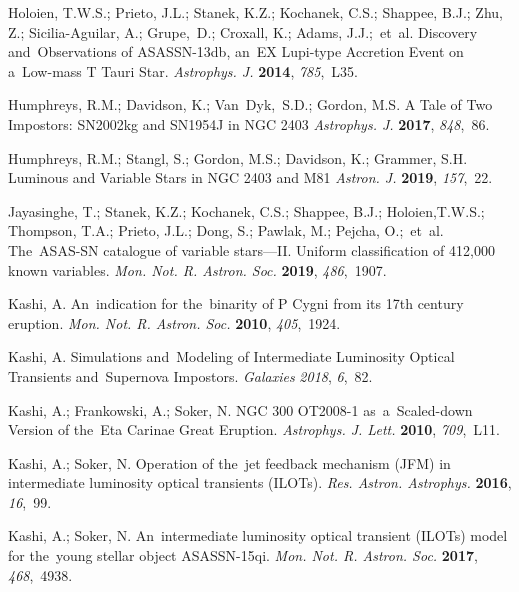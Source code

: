 \documentclass[galaxies,article,accept,moreauthors,pdftex]{mdpi}
\makeatletter
\let\jnl@style=\rmfamily
\def\ref@jnl#1{{\jnl@style#1}}%
\newcommand\aj{\ref@jnl{Astron. J.}}%
\newcommand\apj{\ref@jnl{Astrophys. J.}}%
\newcommand\apjl{\ref@jnl{Astrophys. J. Lett.}}     %
\newcommand\mnras{\ref@jnl{Mon. Not. R. Astron. Soc.}}%
\makeatother
\begin{document}
\begin{thebibliography}{999}
 Holoien, T.W.S.; Prieto, J.L.; Stanek, K.Z.; Kochanek, C.S.; Shappee, B.J.; Zhu, Z.; Sicilia-Aguilar, A.; Grupe,~D.; Croxall, K.; Adams, J.J.;~et~al. Discovery and~Observations of ASASSN-13db, an~EX Lupi-type Accretion Event on a~Low-mass T Tauri Star. {\em \apj} \textbf{2014}, \emph{785},~L35.



 Humphreys, R.M.; Davidson, K.; Van~Dyk,~S.D.; Gordon, M.S. A Tale of Two Impostors: SN2002kg and SN1954J in NGC 2403 {\em \apj} \textbf{2017}, \emph{848},~86.


 Humphreys, R.M.; Stangl, S.; Gordon, M.S.; Davidson, K.; Grammer, S.H. Luminous and Variable Stars in NGC 2403 and M81 {\em \aj} \textbf{2019}, \emph{157},~22.



 Jayasinghe, T.; Stanek, K.Z.; Kochanek, C.S.; Shappee, B.J.; Holoien,T.W.S.; Thompson, T.A.; Prieto, J.L.; Dong, S.; Pawlak, M.; Pejcha, O.;~et~al. The~ASAS-SN catalogue of variable stars---II. Uniform classification of 412,000 known variables. {\em \mnras} \textbf{2019}, \emph{486},~1907.



 Kashi, A. An~indication for the~binarity of P Cygni from its 17th century eruption. {\em \mnras} \textbf{2010}, \emph{405},~1924.


 Kashi, A. Simulations and~Modeling of Intermediate Luminosity Optical Transients and~Supernova Impostors. \emph{Galaxies} \emph{2018}, \emph{6},~82.




 Kashi, A.; Frankowski, A.; Soker, N. NGC 300 OT2008-1 as~a~Scaled-down Version of the~Eta Carinae Great Eruption. {\em \apjl} \textbf{2010}, \emph{709},~L11.



 Kashi, A.; Soker, N. Operation of the~jet feedback mechanism (JFM) in intermediate luminosity optical transients (ILOTs). {\em Res. Astron. Astrophys.} \textbf{2016}, \emph{16},~99.




 Kashi, A.; Soker, N. An~intermediate luminosity optical transient (ILOTs) model for the~young stellar object ASASSN-15qi.  {\em \mnras} \textbf{2017}, \emph{468},~4938. 





\end{thebibliography}
\end{document}
